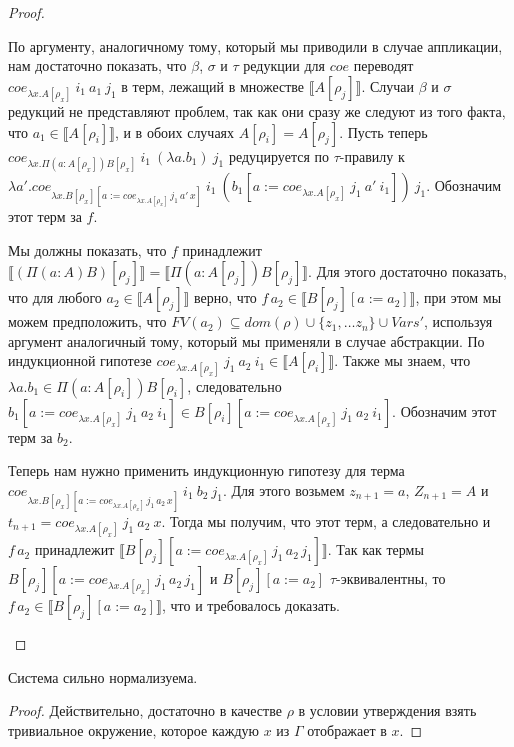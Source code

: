 \documentclass{amsart}
\theoremstyle{definition}
\theoremstyle{remark}
\renewcommand{\ll}{\llbracket}
\newcommand{\rr}{\rrbracket}
\numberwithin{figure}{section}
\begin{document}
\begin{proof}
\begin{itemize}
По аргументу, аналогичному тому, который мы приводили в случае аппликации, нам достаточно показать,
    что $\beta$, $\sigma$ и $\tau$ редукции для $coe$ переводят $coe_{\lambda x. A[\rho_x]}\ i_1\ a_1\ j_1$ в терм, лежащий в множестве $\ll A[\rho_j] \rr$.
Случаи $\beta$ и $\sigma$ редукций не представляют проблем, так как они сразу же следуют из того факта, что $a_1 \in \ll A[\rho_i] \rr$, и в обоих случаях $A[\rho_i] = A[\rho_j]$.
Пусть теперь $coe_{\lambda x. \Pi (a : A[\rho_x]) B[\rho_x]}\ i_1\ (\lambda a. b_1)\ j_1$ редуцируется по $\tau$-правилу к
    $\lambda a'. coe_{\lambda x. B[\rho_x][a := coe_{\lambda x. A[\rho_x]}\,j_1\,a'\,x]}\ i_1\ (b_1[a := coe_{\lambda x. A[\rho_x]}\ j_1\ a'\ i_1])\ j_1$.
Обозначим этот терм за $f$.

Мы должны показать, что $f$ принадлежит $\ll (\Pi (a : A) B)[\rho_j] \rr = \ll \Pi (a : A[\rho_j]) B[\rho_j]\rr$.
Для этого достаточно показать, что для любого $a_2 \in \ll A[\rho_j] \rr$ верно, что $f\,a_2 \in \ll B[\rho_j][a := a_2] \rr$,
    при этом мы можем предположить, что $FV(a_2) \subseteq dom(\rho) \cup \{ z_1, \ldots z_n \} \cup Vars'$, используя аргумент аналогичный тому, который мы применяли в случае абстракции.
По индукционной гипотезе $coe_{\lambda x. A[\rho_x]}\ j_1\ a_2\ i_1 \in \ll A[\rho_i] \rr$.
Также мы знаем, что $\lambda a. b_1 \in \Pi (a : A[\rho_i]) B[\rho_i]$,
    следовательно $b_1[a := coe_{\lambda x. A[\rho_x]}\ j_1\ a_2\ i_1] \in B[\rho_i][a := coe_{\lambda x. A[\rho_x]}\ j_1\ a_2\ i_1]$.
Обозначим этот терм за $b_2$.

Теперь нам нужно применить индукционную гипотезу для терма $coe_{\lambda x. B[\rho_x][a := coe_{\lambda x. A[\rho_x]}\,j_1\,a_2\,x]}\ i_1\ b_2\ j_1$.
Для этого возьмем $z_{n+1} = a$, $Z_{n+1} = A$ и $t_{n+1} = coe_{\lambda x. A[\rho_x]}\ j_1\ a_2\ x$.
Тогда мы получим, что этот терм, а следовательно и $f\,a_2$ принадлежит $\ll B[\rho_j][a := coe_{\lambda x. A[\rho_x]}\,j_1\,a_2\,j_1] \rr$.
Так как термы $B[\rho_j][a := coe_{\lambda x. A[\rho_x]}\,j_1\,a_2\,j_1]$ и $B[\rho_j][a := a_2]$ $\tau$-эквивалентны,
    то $f\,a_2 \in \ll B[\rho_j][a := a_2] \rr$, что и требовалось доказать.

\end{itemize}
\end{proof}

\begin{cor}
Система сильно нормализуема.
\end{cor}
\begin{proof}
Действительно, достаточно в качестве $\rho$ в условии утверждения взять тривиальное окружение, которое каждую $x$ из $\Gamma$ отображает в $x$.
\end{proof}
\end{document}
